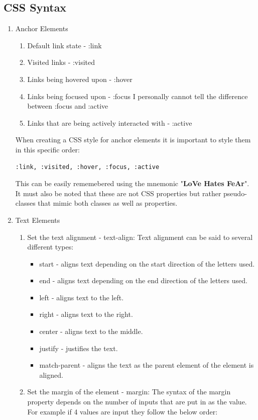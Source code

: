 \documentclass[11pt]{article}
\begin{document}
\subsection{CSS Syntax}
\label{sec:org5bf22f5}
\begin{enumerate}
\item Anchor Elements
\begin{enumerate}
\item Default link state - :link
\item Visited links - :visited
\item Links being hovered upon - :hover
\item Links being focused upon - :focus
I personally cannot tell the difference between :focus and :active
\item Links that are being actively interacted with - :active
\end{enumerate}
When creating a CSS style for anchor elements it is important to style them in this specific
order:
\begin{verbatim}
:link, :visited, :hover, :focus, :active
\end{verbatim}
This can be easily rememebered using the mnemonic "\textbf{LoVe Hates FeAr}". It must also be noted that
these are not CSS properties but rather pseudo-classes that mimic both classes as well as properties.
\item Text Elements
\begin{enumerate}
\item Set the text alignment - text-align:
Text alignment can be said to several different types:
\begin{itemize}
\item start - aligns text depending on the start direction of the letters used.
\item end - aligns text depending on the end direction of the letters used.
\item left - aligns text to the left.
\item right - aligns text to the right.
\item center - aligns text to the middle.
\item justify - justifies the text.
\item match-parent - aligns the text as the parent element of the element is aligned.
\end{itemize}
\item Set the margin of the element - margin:
The syntax of the margin property depends on the number of inputs that are put in as the
value. For example if 4 values are input they follow the below order:

\end{enumerate}
\end{enumerate}
\end{document}
